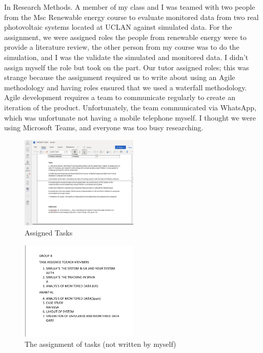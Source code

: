 \documentclass{article}
\begin{document}
In Research Methods. A member of my class and I was teamed with two people from the Msc Renewable energy course to evaluate monitored data from two real photovoltaic systems located at UCLAN against simulated data. For the assignment, we were assigned roles the people from renewable energy were to provide a literature review, the other person from my course was to do the simulation, and I was the validate the simulated and monitored data. I didn't assign myself the role but took on the part. Our tutor assigned roles; this was strange because the assignment required us to write about using an Agile methodology and having roles ensured that we used a waterfall methodology. Agile development requires a team to communicate regularly to create an iteration of the product. Unfortunately, the team communicated via WhatsApp, which was unfortunate not having a mobile telephone myself. I thought we were using Microsoft Teams, and everyone was too busy researching.

 \begin{figure}[h]
\caption{Assigned Tasks}
\centering
\includegraphics[width=0.5\textwidth]{images/feb/tasklist.png}
\end{figure}
 
\begin{figure}[h]
\caption{The assignment of tasks (not written by myself)}
\centering
\includegraphics[width=0.5\textwidth]{images/feb/task_list_group.png}
\end{figure}
\end{document}
